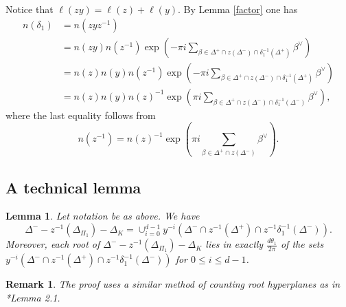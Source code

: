 \documentclass[10pt,leqno]{article}
\newtheorem{lemma}[equation]{Lemma}
\newtheorem{remark}[equation]{Remark}
{\theorembodyfont{\rmfamily}
\newtheorem{theoremplain}[equation]{Theorem}
\newtheorem{remarkplain}[equation]{Remark}
\newtheorem{editorialremarkplain}[equation]{Editorial Remark}
\newtheorem{exampleplain}[equation]{Example}
\newtheorem{corollaryplain}[equation]{Corollary}
}
\def\le{\leqslant}
\def\b{\beta}
\def\d{\delta}
\def\th{\theta}
\def\i{^{-1}}
\begin{document}
Notice that $\ell(z y)=\ell(z) + \ell(y)$. By Lemma \ref{factor} one has
\begin{align*}
n(\d_1) &= n(z y z^{-1}) \\ &=
n(z y) n(z^{-1})\exp(-\pi i\sum_{\b \in \Delta^+ \cap z(\Delta^-) \cap \d_1 \i (\Delta^+)}  \b^\vee) \\
&= n(z) n(y) n(z^{-1}) \exp(-\pi i\sum_{\b \in \Delta^+ \cap z(\Delta^-) \cap \d_1 \i (\Delta^+)} \b^\vee)\\
&= n(z) n(y) n(z)^{-1}\exp(\pi i\sum_{\b \in \Delta^+ \cap z(\Delta^-) \cap \d_1 \i(\Delta^-)}  \b^\vee),
\end{align*} where the last equality follows from $$n(z^{-1})=n(z)^{-1}\exp(\pi i\sum_{\b \in \Delta^+ \cap z(\Delta^-)} \b^\vee).$$

\subsection{A technical lemma}

\begin{lemma} \label{tech}
Let notation be as above. We have $$\Delta^- - z \i(\Delta_{\Pi_1})-\Delta_K = \cup_{i=0}^{d-1} y^{-i}(\Delta^- \cap z \i(\Delta^+) \cap z \i \d_1 \i(\Delta^-)).$$ Moreover, each root of $\Delta^- - z \i(\Delta_{\Pi_1})-\Delta_K$ lies in exactly $\frac{d \th_1} {2\pi}$ of the sets $y^{-i}(\Delta^- \cap z \i(\Delta^+) \cap z \i \d_1 \i(\Delta^-))$ for $0 \le i \le d-1$.
\end{lemma}
\begin{remark}
  The proof uses a similar method of counting root hyperplanes as in
  \cite{he_nie_minimal_finite}*{Lemma 2.1}.
\end{remark}
\end{document}
